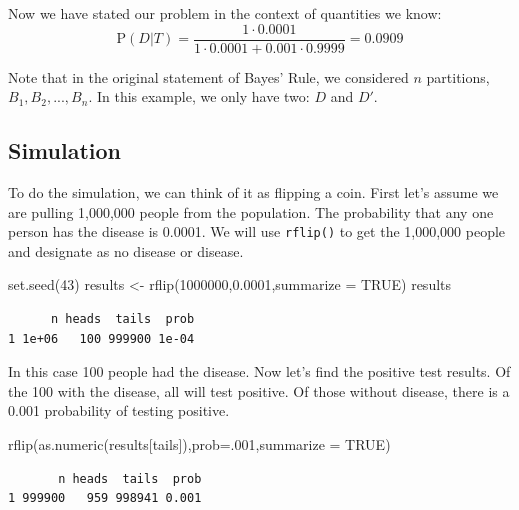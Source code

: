 \documentclass[
  letterpaper,
  DIV=11,
  numbers=noendperiod]{scrreprt}
\newenvironment{Shaded}{\begin{snugshade}}{\end{snugshade}}
\newcommand{\AttributeTok}[1]{\textcolor[rgb]{0.40,0.45,0.13}{#1}}
\newcommand{\ConstantTok}[1]{\textcolor[rgb]{0.56,0.35,0.01}{#1}}
\newcommand{\DecValTok}[1]{\textcolor[rgb]{0.68,0.00,0.00}{#1}}
\newcommand{\FloatTok}[1]{\textcolor[rgb]{0.68,0.00,0.00}{#1}}
\newcommand{\FunctionTok}[1]{\textcolor[rgb]{0.28,0.35,0.67}{#1}}
\newcommand{\NormalTok}[1]{\textcolor[rgb]{0.00,0.23,0.31}{#1}}
\newcommand{\OtherTok}[1]{\textcolor[rgb]{0.00,0.23,0.31}{#1}}
\newcommand{\StringTok}[1]{\textcolor[rgb]{0.13,0.47,0.30}{#1}}
\begin{document}
Now we have stated our problem in the context of quantities we know: \[
\mbox{P}(D|T)=\frac{1\cdot 0.0001}{1\cdot 0.0001 + 0.001\cdot 0.9999} = 0.0909
\]

Note that in the original statement of Bayes' Rule, we considered \(n\)
partitions, \(B_1, B_2,...,B_n\). In this example, we only have two:
\(D\) and \(D'\).

\subsection{Simulation}\label{simulation}

To do the simulation, we can think of it as flipping a coin. First let's
assume we are pulling 1,000,000 people from the population. The
probability that any one person has the disease is 0.0001. We will use
\texttt{rflip()} to get the 1,000,000 people and designate as no disease
or disease.

\begin{Shaded}
\begin{Highlighting}[]
\FunctionTok{set.seed}\NormalTok{(}\DecValTok{43}\NormalTok{)}
\NormalTok{results }\OtherTok{\textless{}{-}} \FunctionTok{rflip}\NormalTok{(}\DecValTok{1000000}\NormalTok{,}\FloatTok{0.0001}\NormalTok{,}\AttributeTok{summarize =} \ConstantTok{TRUE}\NormalTok{)}
\NormalTok{results}
\end{Highlighting}
\end{Shaded}

\begin{verbatim}
      n heads  tails  prob
1 1e+06   100 999900 1e-04
\end{verbatim}

In this case 100 people had the disease. Now let's find the positive
test results. Of the 100 with the disease, all will test positive. Of
those without disease, there is a 0.001 probability of testing positive.

\begin{Shaded}
\begin{Highlighting}[]
\FunctionTok{rflip}\NormalTok{(}\FunctionTok{as.numeric}\NormalTok{(results[}\StringTok{\textquotesingle{}tails\textquotesingle{}}\NormalTok{]),}\AttributeTok{prob=}\NormalTok{.}\DecValTok{001}\NormalTok{,}\AttributeTok{summarize =} \ConstantTok{TRUE}\NormalTok{)}
\end{Highlighting}
\end{Shaded}

\begin{verbatim}
       n heads  tails  prob
1 999900   959 998941 0.001
\end{verbatim}
\end{document}
